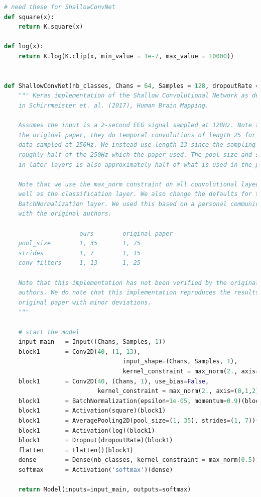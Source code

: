 \documentclass[conference]{IEEEtran}
\begin{document}
\begin{lstlisting}[language=Python, caption=Machine Learning Model, label=ml_model]
# need these for ShallowConvNet
def square(x):
    return K.square(x)

def log(x):
    return K.log(K.clip(x, min_value = 1e-7, max_value = 10000))   


def ShallowConvNet(nb_classes, Chans = 64, Samples = 128, dropoutRate = 0.5):
    """ Keras implementation of the Shallow Convolutional Network as described
    in Schirrmeister et. al. (2017), Human Brain Mapping.
    
    Assumes the input is a 2-second EEG signal sampled at 128Hz. Note that in 
    the original paper, they do temporal convolutions of length 25 for EEG
    data sampled at 250Hz. We instead use length 13 since the sampling rate is 
    roughly half of the 250Hz which the paper used. The pool_size and stride
    in later layers is also approximately half of what is used in the paper.
    
    Note that we use the max_norm constraint on all convolutional layers, as 
    well as the classification layer. We also change the defaults for the
    BatchNormalization layer. We used this based on a personal communication 
    with the original authors.
    
                     ours        original paper
    pool_size        1, 35       1, 75
    strides          1, 7        1, 15
    conv filters     1, 13       1, 25    
    
    Note that this implementation has not been verified by the original 
    authors. We do note that this implementation reproduces the results in the
    original paper with minor deviations. 
    """

    # start the model
    input_main   = Input((Chans, Samples, 1))
    block1       = Conv2D(40, (1, 13), 
                                 input_shape=(Chans, Samples, 1),
                                 kernel_constraint = max_norm(2., axis=(0,1,2)))(input_main)
    block1       = Conv2D(40, (Chans, 1), use_bias=False, 
                          kernel_constraint = max_norm(2., axis=(0,1,2)))(block1)
    block1       = BatchNormalization(epsilon=1e-05, momentum=0.9)(block1)
    block1       = Activation(square)(block1)
    block1       = AveragePooling2D(pool_size=(1, 35), strides=(1, 7))(block1)
    block1       = Activation(log)(block1)
    block1       = Dropout(dropoutRate)(block1)
    flatten      = Flatten()(block1)
    dense        = Dense(nb_classes, kernel_constraint = max_norm(0.5))(flatten)
    softmax      = Activation('softmax')(dense)
    
    return Model(inputs=input_main, outputs=softmax)
    \end{lstlisting}
\end{document}
